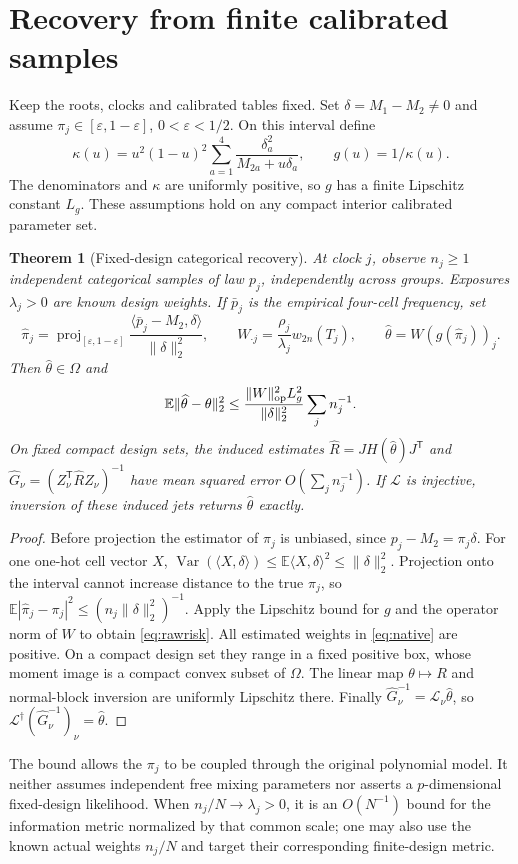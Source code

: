 \documentclass[11pt,reqno]{amsart}
\numberwithin{equation}{section}
\newtheorem{theorem}{Theorem}[section]
\theoremstyle{definition}\newtheorem{definition}[theorem]{Definition}
\theoremstyle{remark}\newtheorem{remark}[theorem]{Remark}
\newcommand{\LL}{\mathcal L}
\newcommand{\eps}{\varepsilon}
\begin{document}
\section{Recovery from finite calibrated samples}\label{sec:raw}
Keep the roots, clocks and calibrated tables fixed. Set $\delta=M_1-M_2\ne0$ and assume $\pi_j\in[\eps,1-\eps]$, $0<\eps<1/2$. On this interval define
\[
 \kappa(u)=u^2(1-u)^2\sum_{a=1}^4
              \frac{\delta_a^2}{M_{2a}+u\delta_a},\qquad g(u)=1/\kappa(u).
\]
The denominators and $\kappa$ are uniformly positive, so $g$ has a finite Lipschitz constant $L_g$. These assumptions hold on any compact interior calibrated parameter set.

\begin{theorem}[Fixed-design categorical recovery]\label{thm:raw}
At clock $j$, observe $n_j\ge1$ independent categorical samples of law $p_j$, independently across groups. Exposures $\lambda_j>0$ are known design weights. If $\bar p_j$ is the empirical four-cell frequency, set
\[
 \widehat\pi_j=\operatorname{proj}_{[\eps,1-\eps]}
          \frac{\langle\bar p_j-M_2,\delta\rangle}{\|\delta\|_2^2},\qquad
 W_{\cdot j}=\frac{\rho_j}{\lambda_j}w_{2n}(T_j),\qquad
 \widehat\theta=W(g(\widehat\pi_j))_j.
\]
Then $\widehat\theta\in\Omega$ and
\begin{equation}\label{eq:rawrisk}
 \mathbb E\|\widehat\theta-\theta\|_2^2
 \le\frac{\|W\|_{\rm op}^2L_g^2}{\|\delta\|_2^2}
                  \sum_j n_j^{-1}.
\end{equation}
On fixed compact design sets, the induced estimates $\widehat R=JH(\widehat\theta)J^{\mathsf T}$ and $\widehat G_\nu=(Z_\nu^{\mathsf T}\widehat RZ_\nu)^{-1}$ have mean squared error $O(\sum_j n_j^{-1})$. If $\LL$ is injective, inversion of these induced jets returns $\widehat\theta$ exactly.
\end{theorem}
\begin{proof}
Before projection the estimator of $\pi_j$ is unbiased, since $p_j-M_2=\pi_j\delta$. For one one-hot cell vector $X$, $\operatorname{Var}(\langle X,\delta\rangle)\le\mathbb E\langle X,\delta\rangle^2\le\|\delta\|_2^2$. Projection onto the interval cannot increase distance to the true $\pi_j$, so
$\mathbb E|\widehat\pi_j-\pi_j|^2\le(n_j\|\delta\|_2^2)^{-1}$.
Apply the Lipschitz bound for $g$ and the operator norm of $W$ to obtain \eqref{eq:rawrisk}. All estimated weights in \eqref{eq:native} are positive. On a compact design set they range in a fixed positive box, whose moment image is a compact convex subset of $\Omega$. The linear map $\theta\mapsto R$ and normal-block inversion are uniformly Lipschitz there. Finally $\widehat G_\nu^{-1}=\LL_\nu\widehat\theta$, so $\LL^\dagger(\widehat G_\nu^{-1})_\nu=\widehat\theta$.
\end{proof}
The bound allows the $\pi_j$ to be coupled through the original polynomial model. It neither assumes independent free mixing parameters nor asserts a $p$-dimensional fixed-design likelihood. When $n_j/N\to\lambda_j>0$, it is an $O(N^{-1})$ bound for the information metric normalized by that common scale; one may also use the known actual weights $n_j/N$ and target their corresponding finite-design metric.
\end{document}
